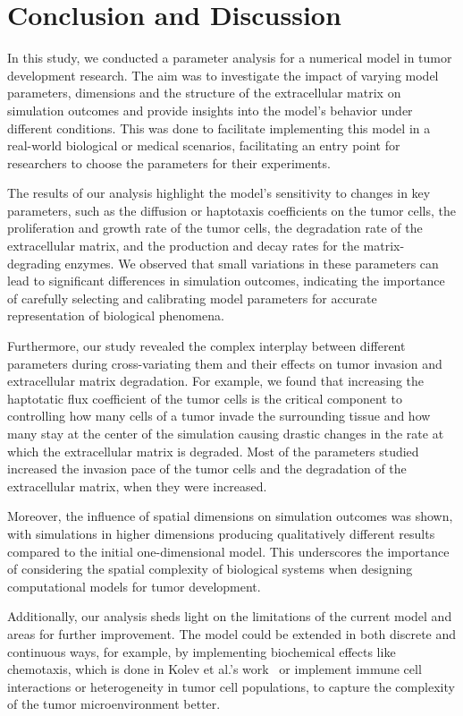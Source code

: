 \section{Conclusion and Discussion}
In this study, we conducted a parameter analysis for a numerical model in tumor development research. The aim was to investigate the impact of varying model parameters, dimensions and the structure of the extracellular matrix on simulation outcomes and provide insights into the model's behavior under different conditions. This was done to facilitate implementing this model in a real-world biological or medical scenarios, facilitating an entry point for researchers to choose the parameters for their experiments.

The results of our analysis highlight the model's sensitivity to changes in key parameters, such as the diffusion or haptotaxis coefficients on the tumor cells, the proliferation and growth rate of the tumor cells, the degradation rate of the extracellular matrix, and the production and decay rates for the matrix-degrading enzymes. We observed that small variations in these parameters can lead to significant differences in simulation outcomes, indicating the importance of carefully selecting and calibrating model parameters for accurate representation of biological phenomena.

Furthermore, our study revealed the complex interplay between different parameters during cross-variating them and their effects on tumor invasion and extracellular matrix degradation. For example, we found that increasing the haptotatic flux coefficient of the tumor cells is the critical component to controlling how many cells of a tumor invade the surrounding tissue and how many stay at the center of the simulation causing drastic changes in the rate at which the extracellular matrix is degraded. Most of the parameters studied increased the invasion pace of the tumor cells and the degradation of the extracellular matrix, when they were increased.

Moreover, the influence of spatial dimensions on simulation outcomes was shown, with simulations in higher dimensions producing qualitatively different results compared to the initial one-dimensional model. This underscores the importance of considering the spatial complexity of biological systems when designing computational models for tumor development.

Additionally, our analysis sheds light on the limitations of the current model and areas for further improvement. The model could be extended in both discrete and continuous ways, for example, by implementing biochemical effects like chemotaxis, which is done in Kolev et al.'s work~\cite{Kolev2010} or implement immune cell interactions or heterogeneity in tumor cell populations, to capture the complexity of the tumor microenvironment better.

